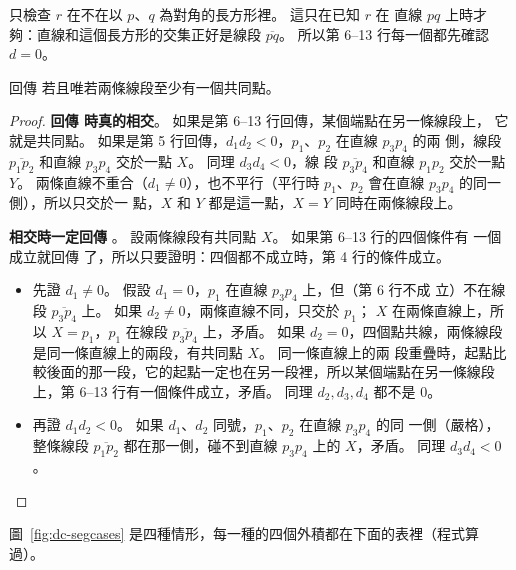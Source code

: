  只檢查 $r$ 在不在以 $p$、$q$ 為對角的長方形裡。 這只在已知 $r$ 在
直線 $pq$ 上時才夠：直線和這個長方形的交集正好是線段 $\overline{pq}$。 所以第 6--13
行每一個都先確認 $d = 0$。

\begin{lemma}
\label{lem:dc-segint}
 回傳 \TRUE{} 若且唯若兩條線段至少有一個共同點。
\end{lemma}

\begin{proof}
\textbf{回傳 \TRUE{} 時真的相交}。 如果是第 6--13 行回傳，某個端點在另一條線段上，
它就是共同點。 如果是第 5 行回傳，$d_1 d_2 < 0$，$p_1$、$p_2$ 在直線 $p_3 p_4$ 的兩
側，線段 $\overline{p_1 p_2}$ 和直線 $p_3 p_4$ 交於一點 $X$。 同理 $d_3 d_4 < 0$，線
段 $\overline{p_3 p_4}$ 和直線 $p_1 p_2$ 交於一點 $Y$。 兩條直線不重合（$d_1 \ne
0$），也不平行（平行時 $p_1$、$p_2$ 會在直線 $p_3 p_4$ 的同一側），所以只交於一
點，$X$ 和 $Y$ 都是這一點，$X = Y$ 同時在兩條線段上。

\textbf{相交時一定回傳 \TRUE}。 設兩條線段有共同點 $X$。 如果第 6--13 行的四個條件有
一個成立就回傳 \TRUE 了，所以只要證明：四個都不成立時，第 4 行的條件成立。
\begin{itemize}
\item 先證 $d_1 \ne 0$。 假設 $d_1 = 0$，$p_1$ 在直線 $p_3 p_4$ 上，但（第 6 行不成
立）不在線段 $\overline{p_3 p_4}$ 上。 如果 $d_2 \ne 0$，兩條直線不同，只交於 $p_1$；
$X$ 在兩條直線上，所以 $X = p_1$，$p_1$ 在線段 $\overline{p_3 p_4}$ 上，矛盾。 如果
$d_2 = 0$，四個點共線，兩條線段是同一條直線上的兩段，有共同點 $X$。 同一條直線上的兩
段重疊時，起點比較後面的那一段，它的起點一定也在另一段裡，所以某個端點在另一條線段
上，第 6--13 行有一個條件成立，矛盾。 同理 $d_2, d_3, d_4$ 都不是 $0$。
\item 再證 $d_1 d_2 < 0$。 如果 $d_1$、$d_2$ 同號，$p_1$、$p_2$ 在直線 $p_3 p_4$ 的同
一側（嚴格），整條線段 $\overline{p_1 p_2}$ 都在那一側，碰不到直線 $p_3 p_4$ 上的
$X$，矛盾。 同理 $d_3 d_4 < 0$。 \qedhere
\end{itemize}
\end{proof}

圖~\ref{fig:dc-segcases} 是四種情形，每一種的四個外積都在下面的表裡（程式算過）。

